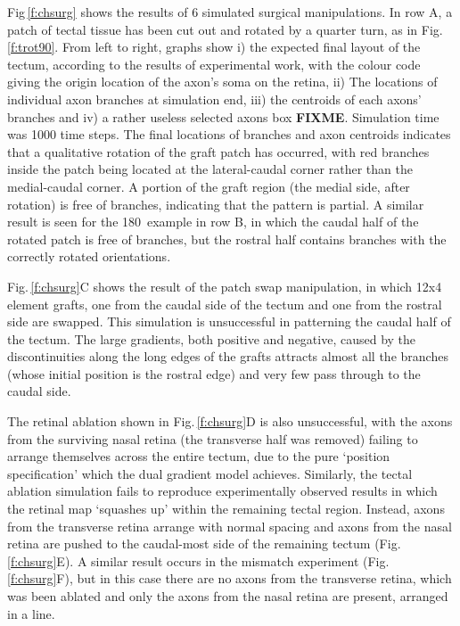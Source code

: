 \documentclass[11pt, a4paper]{article}
\begin{document}
Fig\,\ref{f:chsurg} shows the results of 6 simulated surgical
manipulations. In row A, a patch of tectal tissue has been cut out and rotated
by a quarter turn, as in Fig.\,\ref{f:trot90}. From left to right, graphs show
i) the expected final layout of the tectum, according to the results of
experimental work, with the colour code giving the origin location of the
axon's soma on the retina, ii) The locations of individual axon branches at
simulation end, iii) the centroids of each axons' branches and iv) a rather
useless selected axons box \textbf{FIXME}. Simulation time was 1000 time steps. The final
locations of branches and axon centroids indicates that a qualitative rotation
of the graft patch has occurred, with red branches inside the patch being
located at the lateral-caudal corner rather than the medial-caudal corner. A
portion of the graft region (the medial side, after rotation) is free of
branches, indicating that the pattern is partial. A similar result is seen for
the 180\degree~example in row B, in which the caudal half of the rotated patch
is free of branches, but the rostral half contains branches with the correctly
rotated orientations.

Fig.\,\ref{f:chsurg}C shows the result of the patch swap manipulation, in
which 12x4 element grafts, one from the caudal side of the tectum and one from
the rostral side are swapped. This simulation is unsuccessful in patterning
the caudal half of the tectum. The large gradients, both positive and
negative, caused by the discontinuities along the long edges of the grafts
attracts almost all the branches (whose initial position is the rostral edge)
and very few pass through to the caudal side.

The retinal ablation shown in Fig.\,\ref{f:chsurg}D is also unsuccessful, with
the axons from the surviving nasal retina (the transverse half was removed)
failing to arrange themselves across the entire tectum, due to the pure
`position specification' which the dual gradient model achieves. Similarly,
the tectal ablation simulation fails to reproduce experimentally observed
results in which the retinal map `squashes up' within the remaining tectal
region. Instead, axons from the transverse retina arrange with normal spacing
and axons from the nasal retina are pushed to the caudal-most side of the
remaining tectum (Fig.\,\ref{f:chsurg}E). A similar result occurs in the
mismatch experiment (Fig.\,\ref{f:chsurg}F), but in this case there are no
axons from the transverse retina, which was been ablated and only the axons
from the nasal retina are present, arranged in a line.
\end{document}

